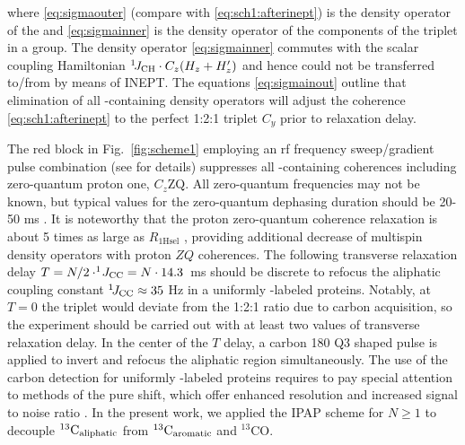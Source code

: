 \documentclass[twocolumn]{svjour3}           %
\begin{document}
where \eqref{eq:sigmaouter} (compare with \eqref{eq:sch1:afterinept}) is 
the density operator of the \qouter{} and \eqref{eq:sigmainner} is 
the density operator of the \qinner{} 
components of the \clab{} triplet in a \CHtwo{} group. The density operator 
\eqref{eq:sigmainner} commutes with the scalar coupling Hamiltonian 
$^1\!J_\text{CH} \cdot C_z(H_z+H'_z)$
and hence could not be transferred to/from \hlab{} by means of INEPT. 
The equations \eqref{eq:sigmainout} outline that elimination of all \hlab-containing
density operators will adjust the coherence \eqref{eq:sch1:afterinept}
to the perfect 1:2:1 triplet $C_y$ 
\cite{banci_side_2001,zheng_measurement_2004,yang_study_1998} 
prior to relaxation delay. 

The red block in  Fig.~\ref{fig:scheme1} employing an rf frequency sweep\slash gradient pulse 
combination (see \cite{thrippleton_elimination_2003,harris_zero-quantum_2011,claridge_experimental_2009} for details) suppresses all \hlab-containing coherences including zero-quantum proton one, $C_z \text{ZQ}$. All zero-\-quan\-tum frequencies may not be known, but typical values for the zero-quantum dephasing duration should be 20-50 ms \cite{claridge_experimental_2009}.
It is noteworthy that the proton zero-quantum 
coherence relaxation is about 5 times as large as $R_{\text{1Hsel}}$ 
\cite{zheng_measurement_2004}, providing additional decrease of multispin density operators with proton $ZQ$ coherences.
The following transverse relaxation delay  
$T = {N}/{2\cdot^1\!J_{\text{CC}}} = N\cdot 14.3$~ms should be discrete 
to refocus the aliphatic coupling constant $^1\!J_{\text{CC}} \approx 35$ Hz in a 
uniformly \nclab-labeled proteins. Notably, at $T = 0$ the \clab{} triplet 
would deviate from the 1:2:1 ratio due to carbon acquisition, so the 
experiment should be carried out with at least two values of transverse 
relaxation delay. In the center of the $T$ delay, a carbon 180\degree{} Q3 
shaped pulse is applied to invert and refocus the aliphatic region 
simultaneously. The use of the carbon detection for uniformly \nclab-labeled proteins requires 
to pay special attention to methods of the \clab{} pure shift, which offer 
enhanced resolution and increased signal to noise ratio 
\cite{zangger_pure_2015}. In the present work, we applied the {IPAP} scheme 
for $N \ge 1$ to decouple ${}^{13}\text{C}_\text{aliphatic}$ from 
${}^{13}\text{C}_\text{aromatic}$ and $^{13}\text{CO}$. 
\end{document}
